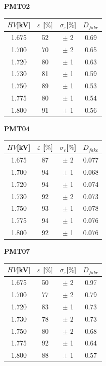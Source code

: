 \documentclass[10pt,a4paper]{article}
\begin{document}
\newpage

\begin{center}

\begin{minipage}{0.32\textwidth}
\centering
\textbf{PMT02}

\vspace{0.25cm}

\begin{tabular}{|c|c|c|c|}
\toprule
$HV$[kV]& $\varepsilon$ [$\%$] & $\sigma_{\varepsilon}$[$\%$] & $D_{fake}$ \\
\midrule
1.675 & 52 & $\pm$ 2 & 0.69 \\
1.700 & 70 & $\pm$ 2 & 0.65 \\
1.720 & 80 & $\pm$ 1 & 0.63 \\
1.730 & 81 & $\pm$ 1 & 0.59 \\
1.750 & 89 & $\pm$ 1 & 0.53 \\
1.775 & 80 & $\pm$ 1 & 0.54 \\
1.800 & 91 & $\pm$ 1 & 0.56 \\
\bottomrule
\end{tabular}
\end{minipage}
\hfill
\begin{minipage}{0.32\textwidth}
\centering
\textbf{PMT04}

\vspace{0.25cm}

\begin{tabular}{|c|c|c|c|}
\toprule
$HV$[kV]& $\varepsilon$ [$\%$] & $\sigma_{\varepsilon}$[$\%$] & $D_{fake}$ \\
\midrule
1.675 & 87 & $\pm$ 2 & 0.077 \\
1.700 & 94 & $\pm$ 1 & 0.068 \\
1.720 & 94 & $\pm$ 1 & 0.074 \\
1.730 & 92 & $\pm$ 2 & 0.073 \\
1.750 & 93 & $\pm$ 1 & 0.078 \\
1.775 & 94 & $\pm$ 1 & 0.076 \\
1.800 & 92 & $\pm$ 1 & 0.076 \\
\bottomrule
\end{tabular}
\end{minipage}
\hfill
\begin{minipage}{0.32\textwidth}
\centering
\textbf{PMT07}

\vspace{0.25cm}

\begin{tabular}{|c|c|c|c|}
\toprule
$HV$[kV]& $\varepsilon$ [$\%$] & $\sigma_{\varepsilon}$[$\%$] & $D_{fake}$ \\
\midrule
1.675 & 50 & $\pm$ 2 & 0.97 \\
1.700 & 77 & $\pm$ 2 & 0.79 \\
1.720 & 83 & $\pm$ 1 & 0.73 \\
1.730 & 78 & $\pm$ 2 & 0.73 \\
1.750 & 80 & $\pm$ 2 & 0.68 \\
1.775 & 92 & $\pm$ 1 & 0.64 \\
1.800 & 88 & $\pm$ 1 & 0.57 \\
\bottomrule
\end{tabular}
\end{minipage}


\end{center}
\end{document}
